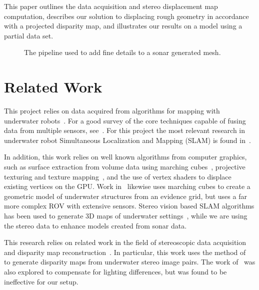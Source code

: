 \documentclass{llncs}
\begin{document}
This paper outlines the data acquisition and stereo displacement map computation, describes our solution to displacing rough geometry in accordance with a projected disparity map, and illustrates our results on a model using a partial  data set.

\begin{figure*}[!ht]
  \vspace{-0.2cm}
  \caption{The pipeline used to add fine details to a sonar generated mesh.}
 \label{fig:systemblock}
\end{figure*}

\vspace{-5pt}
\section{Related Work}
\label{sec:related_work}
\noindent This project relies on data acquired from algorithms for mapping with underwater robots~\cite{Williams09,opizarro-2009a,Fairfield2006,Clark2008b}. For a good survey of the core techniques capable of fusing data from multiple sensors, see~\cite{Thrun2005}.
For this project the most relevant  research in underwater robot Simultaneous Localization and Mapping (SLAM) is found in~\cite{Williams2000,harbor,Fairfield2005,Fairfield2006}.

In addition, this work relies on well known algorithms from computer graphics, such as surface extraction from volume data using marching cubes~\cite{Lorensen}, projective texturing and texture mapping~\cite{Williams78castingcurved,Segal}, and the use of vertex shaders to displace existing vertices on the GPU. Work in~\cite{Fairfield:2010} likewise uses marching cubes to create a geometric model of underwater structures from an evidence grid, but uses a far more complex ROV with extensive sensors.
Stereo vision based SLAM algorithms has been used to generate 3D maps of underwater settings~\cite{Mahon:2011,stereo:Roberson,stereo:Aqua}, while we are using the stereo data to enhance models created from sonar data.

This research relies on related work in the field of stereoscopic data acquisition and disparity map reconstruction~\cite{stereo:scharsteinSzeliski}.
In particular, this work uses the method of~\cite{stereo:zitKan} to generate disparity maps from underwater stereo image pairs.
The work of~\cite{stereo:nalGast} was also explored to compensate for lighting differences, but was found to be ineffective for our setup. 
\vspace{-11pt}
\end{document}
